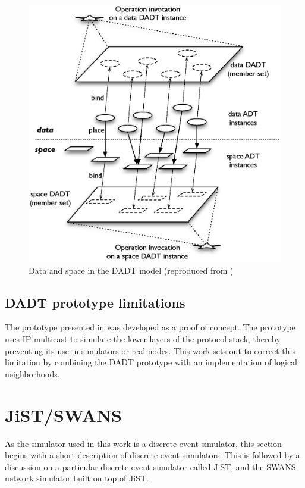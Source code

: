 \begin{figure}
\centering
\label{Fig:DADTs}
\includegraphics[scale=0.50]{img/DADTs.eps} \caption[Data and space in the DADT 
model]{Data and space in the DADT model (reproduced from 
\cite{migliavacca_DADT:2006})}
\end{figure}


\subsection {DADT prototype limitations}

The prototype presented in \cite{migliavacca_DADT:2006} was developed as a proof of 
concept. The prototype uses IP multicast to simulate the lower layers of the 
protocol stack, thereby preventing its use in simulators or real nodes. This 
work sets out to correct this limitation by combining the DADT prototype with 
an implementation of logical neighborhoods. %

\section {JiST/SWANS}

As the simulator used in this work is a discrete event simulator, this section 
begins with a short description of discrete event simulators. 
This is followed by a discussion on a particular discrete event simulator
called JiST, and the SWANS network simulator built on top of JiST.

